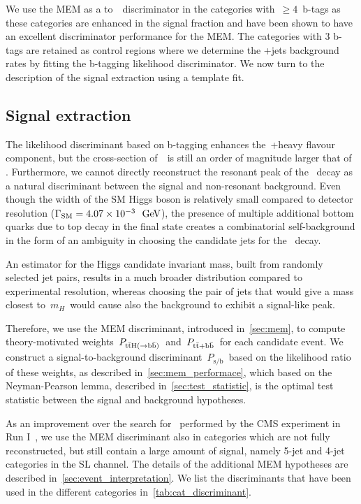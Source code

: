 We use the MEM as a \ttHbb\xspace to~\ttbb~discriminator in the categories with~$\ge 4$~b-tags as these categories are enhanced in the signal fraction and have been shown to have an excellent discriminator performance for the MEM. The categories with 3 b-tags are retained as control regions where we determine the \ttbar+jets background rates by fitting the b-tagging likelihood discriminator. We now turn to the description of the signal extraction using a template fit. 

\subsection{Signal extraction}
\label{sec:mem_application}
The likelihood discriminant based on b-tagging enhances the~\ttbar+heavy flavour component, but the cross-section of~\ttbb~is still an order of magnitude larger that of \ttHbb. Furthermore, we cannot directly reconstruct the resonant peak of the \Hbb~decay as a natural discriminant between the signal and non-resonant background. Even though the width of the SM Higgs boson is relatively small compared to detector resolution ($\Gamma_{\mathrm{SM}} = 4.07 \times 10^{-3}~~\mathrm{GeV}$), the presence of multiple additional bottom quarks due to top decay in the final state creates a combinatorial self-background in the form of an ambiguity in choosing the candidate jets for the \Hbb~decay.

An estimator for the Higgs candidate invariant mass, built from randomly selected jet pairs, results in a much broader distribution compared to experimental resolution, whereas choosing the pair of jets that would give a mass closest to~$m_H$~would cause also the background to exhibit a signal-like peak.

Therefore, we use the MEM discriminant, introduced in~\cref{sec:mem}, to compute theory-motivated weights~$P_{\mathrm{t} \bar{\mathrm{t}} \mathrm{H} (\rightarrow \mathrm{b}\bar{\mathrm{b}})}$~and~$P_{\mathrm{t} \bar{\mathrm{t}} + \mathrm{b}\bar{\mathrm{b}}}$~for each candidate event. We construct a signal-to-background discriminant~$P_{\mathrm{s/b}}$~based on the likelihood ratio of these weights, as described in~\cref{sec:mem_performace}, which based on the Neyman-Pearson lemma, described in~\cref{sec:test_statistic}, is the optimal test statistic between the signal and background hypotheses.

As an improvement over the search for~\ttHbb\xspace performed by the CMS experiment in Run I~\cite{Khachatryan:2015ila}, we use the MEM discriminant also in categories which are not fully reconstructed, but still contain a large amount of signal, namely 5-jet and 4-jet categories in the SL channel. The details of the additional MEM hypotheses are described in~\cref{sec:event_interpretation}. We list the discriminants that have been used in the different categories in~\cref{tab:cat_discriminant}. 


